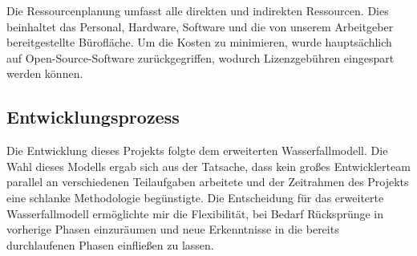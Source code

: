 Die Ressourcenplanung umfasst alle direkten und indirekten Ressourcen. 
Dies beinhaltet das Personal, 
Hardware, Software und die von unserem Arbeitgeber 
bereitgestellte Bürofläche. Um die Kosten zu minimieren, 
wurde hauptsächlich auf Open-Source-Software zurückgegriffen, 
wodurch Lizenzgebühren eingespart werden können.


\subsection{Entwicklungsprozess}
\label{sec:Entwicklungsprozess}
Die Entwicklung dieses Projekts folgte dem erweiterten Wasserfallmodell. 
Die Wahl dieses Modells ergab sich aus der Tatsache,
dass kein großes Entwicklerteam parallel an verschiedenen Teilaufgaben arbeitete 
und der Zeitrahmen des Projekts eine schlanke Methodologie begünstigte.
Die Entscheidung für das erweiterte Wasserfallmodell ermöglichte mir die Flexibilität, 
bei Bedarf Rücksprünge in vorherige Phasen einzuräumen und neue Erkenntnisse 
in die bereits durchlaufenen Phasen einfließen zu lassen. 
